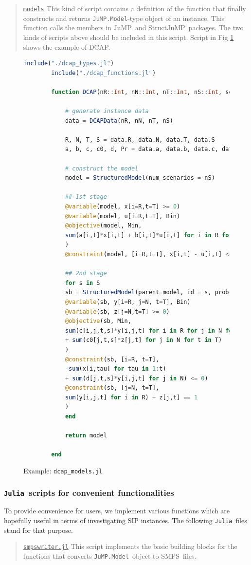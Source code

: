 \documentclass{hitec}
\newcommand{\smps}{\textsf{SMPS}}
\newcommand{\jump}{\textsf{JuMP}}
\newcommand{\structjump}{\textsf{StructJuMP}}
\newcommand{\dcap}{\textsf{DCAP}}
\newcommand{\julia}{\texttt{Julia}}
\newcommand{\jumpmodel}{\texttt{JuMP.Model}}
\begin{document}
	\begin{quote}
		\noindent\underline{\texttt{models}} This kind of script contains a definition of the function that finally constructs and returns \jumpmodel-type object of an instance. This function calls the members in \jump\ and \structjump\ packages. The two kinds of scripts above should be included in this script. Script in Fig \ref{fig:dcap_models} shows the example of \dcap.
	\end{quote}
	\begin{figure}[H]
		\centering
		\begin{lstlisting}[frame=single,language=julia]
		include("./dcap_types.jl")
		include("./dcap_functions.jl")
		
		function DCAP(nR::Int, nN::Int, nT::Int, nS::Int, seed::Int)::JuMP.Model
		
			# generate instance data
			data = DCAPData(nR, nN, nT, nS)
			
			R, N, T, S = data.R, data.N, data.T, data.S
			a, b, c, c0, d, Pr = data.a, data.b, data.c, data.c0, data.d, data.Pr
			
			# construct the model
			model = StructuredModel(num_scenarios = nS)
			
			## 1st stage
			@variable(model, x[i=R,t=T] >= 0)
			@variable(model, u[i=R,t=T], Bin)
			@objective(model, Min, 
			sum(a[i,t]*x[i,t] + b[i,t]*u[i,t] for i in R for t in T)
			)
			@constraint(model, [i=R,t=T], x[i,t] - u[i,t] <= 0)
			
			## 2nd stage
			for s in S
			sb = StructuredModel(parent=model, id = s, prob = Pr[s])
			@variable(sb, y[i=R, j=N, t=T], Bin)
			@variable(sb, z[j=N,t=T] >= 0)
			@objective(sb, Min, 
			sum(c[i,j,t,s]*y[i,j,t] for i in R for j in N for t in T) 
			+ sum(c0[j,t,s]*z[j,t] for j in N for t in T)
			)
			@constraint(sb, [i=R, t=T], 
			-sum(x[i,tau] for tau in 1:t) 
			+ sum(d[j,t,s]*y[i,j,t] for j in N) <= 0)
			@constraint(sb, [j=N, t=T], 
			sum(y[i,j,t] for i in R) + z[j,t] == 1
			)
			end
			
			return model
		
		end
		\end{lstlisting}
		\caption{Example: \texttt{dcap\_models.jl}}\label{fig:dcap_models}
	\end{figure}
	
	\subsubsection{\julia\ scripts for convenient functionalities}
	To provide convenience for users, we implement various functions which are hopefully useful in terms of investigating SIP instances. The following \julia\ files stand for that purpose.
	\begin{quotation}
		\noindent\underline{\texttt{smpswriter.jl}} This script implements the basic building blocks for the functions that converts \jumpmodel\ object to \smps\ files. 
	\end{quotation}
	
\end{document}
